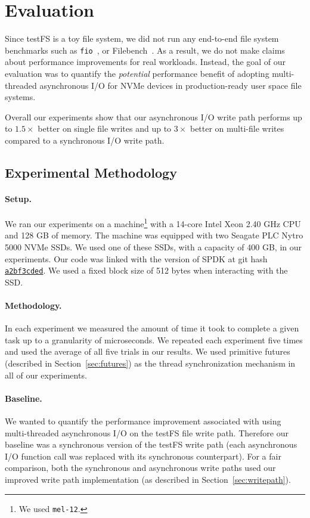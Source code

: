 \section{Evaluation}
Since testFS is a toy file system, we did not run any end-to-end file system
benchmarks such as {\tt fio}~\cite{fio}, or
Filebench~\cite{filebench-tarasov16}. As a result, we do not make claims about
performance improvements for real workloads. Instead, the goal of our
evaluation was to quantify the {\it potential} performance benefit of adopting
multi-threaded asynchronous I/O for NVMe devices in production-ready user space
file systems.

Overall our experiments show that our asynchronous I/O write path performs up
to $1.5\times$ better on single file writes and up to $3\times$ better on
multi-file writes compared to a synchronous I/O write path.

\subsection{Experimental Methodology}
\paragraph{Setup.}
We ran our experiments on a machine\footnote{We used {\tt mel-12}.} with a
14-core Intel Xeon 2.40 GHz CPU and 128 GB of memory. The machine was equipped
with two Seagate PLC Nytro 5000 NVMe SSDs. We used one of these SSDs, with a
capacity of 400 GB, in our experiments. Our code was linked with the version of
SPDK at git hash
\href{https://github.com/spdk/spdk/commit/a2bf3cded37b7cc7e402eae80da90891f921b56d}{\tt a2bf3cded}.
We used a fixed block size of 512 bytes when interacting with the SSD.

\paragraph{Methodology.}
In each experiment we measured the amount of time it took to complete a given
task up to a granularity of microseconds. We repeated each experiment five
times and used the average of all five trials in our results. We used primitive
futures (described in Section~\ref{sec:futures}) as the thread synchronization
mechanism in all of our experiments.

\paragraph{Baseline.}
We wanted to quantify the performance improvement associated with using
multi-threaded asynchronous I/O on the testFS file write path. Therefore
our baseline was a synchronous version of the testFS write path (each
asynchronous I/O function call was replaced with its synchronous counterpart).
For a fair comparison, both the synchronous and asynchronous write paths used
our improved write path implementation (as described in
Section~\ref{sec:writepath}).

